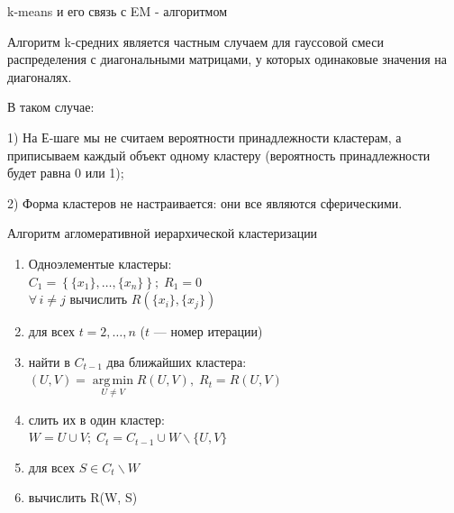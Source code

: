 \documentclass{beamer}
\DeclareMathOperator*{\argmin}{arg\,min}
\begin{document}

\begin{frame}{k-means и его связь с EM - алгоритмом}

Алгоритм k-средних является частным случаем для гауссовой смеси распределения с диагональными матрицами, у которых одинаковые значения на диагоналях. 

В таком случае:

1) На Е-шаге мы не считаем вероятности принадлежности кластерам, а приписываем каждый объект одному кластеру (вероятность принадлежности будет равна 0 или 1);

2) Форма кластеров не настраивается: они все являются сферическими.

\end{frame}

\begin{frame}{Алгоритм агломеративной иерархической кластеризации}
    \begin{enumerate}
        \item Одноэлементые кластеры:\\
        $C_1 = \left\{\{x_1\}, \dots, \{x_n\}\right\}; \; R_1 = 0$\\
        $\forall\, i \neq j \text{ вычислить } R(\{x_i\}, \{x_j\})$
        \item для всех $t = 2, \dots, n$ ($t$ --- номер итерации)
        \item найти в $C_{t-1}$ два ближайших кластера:\\
        $(U, V) = \argmin\limits_{U \neq V}R(U, V), \; R_t = R(U, V)$
        \item слить их в один кластер:\\
        $W = U \cup V; \; C_t = C_{t-1} \cup W \backslash \{U, V\}$
        \item для всех $S \in C_t \backslash W $
        \item вычислить R(W, S)
    \end{enumerate}
\end{frame}
\end{document}
